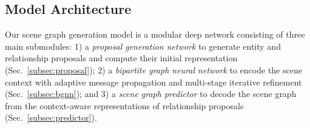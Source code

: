 \subsection{Model Architecture}\label{subsec:model}

Our scene graph generation model is a modular deep network consisting of three main submodules: 1) a \textit{proposal generation network} to generate entity and relationship proposals and compute their initial representation (Sec.~\ref{subsec:proposal}); 2) a \textit{bipartite graph neural network} to encode the scene context with adaptive message propagation and multi-stage iterative refinement (Sec.~\ref{subsec:bgnn}); and 3) a \textit{scene graph predictor} to decode the scene graph from the context-aware representations of relationship proposals (Sec.~\ref{subsec:predictor}).









